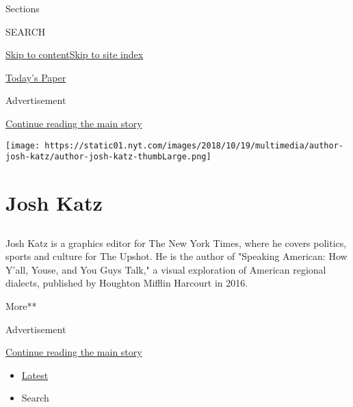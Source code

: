 Sections

SEARCH

\protect\hyperlink{site-content}{Skip to
content}\protect\hyperlink{site-index}{Skip to site index}

\href{https://myaccount.nytimes.com/auth/login?response_type=cookie\&client_id=vi}{}

\href{https://www.nytimes.com/section/todayspaper}{Today's Paper}

Advertisement

\protect\hyperlink{after-top}{Continue reading the main story}

\texttt{[image: https://static01.nyt.com/images/2018/10/19/multimedia/author-josh-katz/author-josh-katz-thumbLarge.png]}

\hypertarget{josh-katz}{%
\section{Josh Katz}\label{josh-katz}}

\subsection{}

Josh Katz is a graphics editor for The New York Times, where he covers
politics, sports and culture for The Upshot. He is the author of
"Speaking American: How Y'all, Youse, and You Guys Talk," a visual
exploration of American regional dialects, published by Houghton Mifflin
Harcourt in 2016.

More**

Advertisement

\protect\hyperlink{after-mid1}{Continue reading the main story}

\begin{itemize}
\tightlist
\item
  \protect\hyperlink{stream-panel}{Latest}
\item
  Search
\end{itemize}

